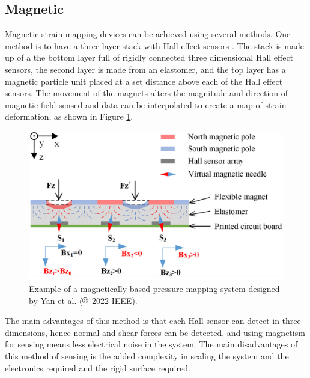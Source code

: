 \subsection{Magnetic}
Magnetic strain mapping devices can be achieved using several methods. One method is to have a three layer stack with Hall effect sensors \cite{Yan2021,Yan2022}. The stack is made up of a the bottom layer full of rigidly connected three dimensional Hall effect sensors, the second layer is made from an elastomer, and the top layer has a magnetic particle unit placed at a set distance above each of the Hall effect sensors. The movement of the magnets alters the magnitude and direction of magnetic field sensed and data can be interpolated to create a map of strain deformation, as shown in Figure \ref{fig:mag_pressure_map_sensor}. 
\begin{figure}[H]
	\centering
	\includegraphics[width=0.6\linewidth]{Figures/mag_pressure_mapping.png}
	\caption{Example of a magnetically-based pressure mapping system designed by Yan et al. \cite{Yan2022} ($\copyright$ 2022 IEEE).}
	\label{fig:mag_pressure_map_sensor}
\end{figure}
The main advantages of this method is that each Hall sensor can detect in three dimensions, hence normal and shear forces can be detected, and using magnetism for sensing means less electrical noise in the system. The main disadvantages of this method of sensing is the added complexity in scaling the system and the electronics required and the rigid surface required.  

